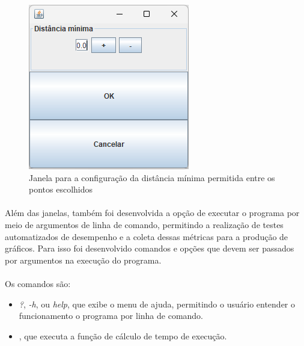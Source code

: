 \documentclass[12pt]{article}
\begin{document}
\begin{figure}
    \centering
    \includegraphics[width=\textwidth]{Captura de tela 2024-06-01 111132}
    \caption{Janela para a configuração da distância mínima permitida entre os pontos escolhidos}
    \label{fig:fig-8}
\end{figure}

\paragraph{}Além das janelas, também foi desenvolvida a opção de executar o programa por meio de argumentos de linha de comando, permitindo a realização de testes automatizados de desempenho e a coleta dessas métricas para a produção de gráficos. Para isso foi desenvolvido comandos e opções que devem ser passados por argumentos na execução do programa.

\paragraph{}Os comandos são: 

\begin{itemize}
    \item \textit{?}, \textit{-h}, ou \textit{\-\-help}, que exibe o menu de ajuda, permitindo o usuário entender o funcionamento o programa por linha de comando.
    \item {}, que executa a função de cálculo de tempo de execução.
\end{itemize}
\end{document}
